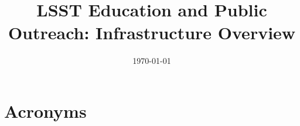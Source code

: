 \documentclass[modern]{aastex62}
\begin{document}

\date{\today}
\title{LSST Education and Public Outreach: Infrastructure Overview}





\appendix
% 



\section{Acronyms} \label{sec:acronyms}

\end{document}
